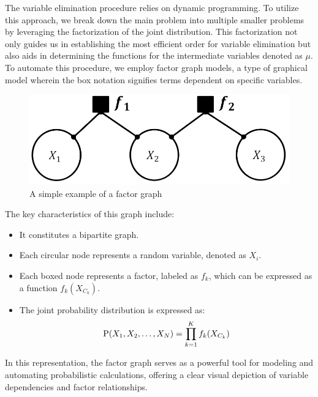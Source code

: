 The variable elimination procedure relies on dynamic programming. 
To utilize this approach, we break down the main problem into multiple smaller problems by leveraging the factorization of the joint distribution. 
This factorization not only guides us in establishing the most efficient order for variable elimination but also aids in determining the functions for the intermediate variables denoted as $\mu$.
To automate this procedure, we employ factor graph models, a type of graphical model wherein the box notation signifies terms dependent on specific variables. 
\begin{figure}[H]
    \centering
    \includegraphics[width=0.25\linewidth]{images/fg.png}
    \caption{A simple example of a factor graph}
\end{figure}
The key characteristics of this graph include:
\begin{itemize}
    \item It constitutes a bipartite graph.
    \item Each circular node represents a random variable, denoted as $X_i$.
    \item Each boxed node represents a factor, labeled as $f_k$, which can be expressed as a function $f_k(X_{C_k})$. 
    \item The joint probability distribution is expressed as:
        \[\textnormal{P}(X_1,X_2,\dots,X_N)=\prod_{k=1}^K{f_k(X_{C_k})}\]
\end{itemize}
In this representation, the factor graph serves as a powerful tool for modeling and automating probabilistic calculations, offering a clear visual depiction of variable dependencies and factor relationships.

